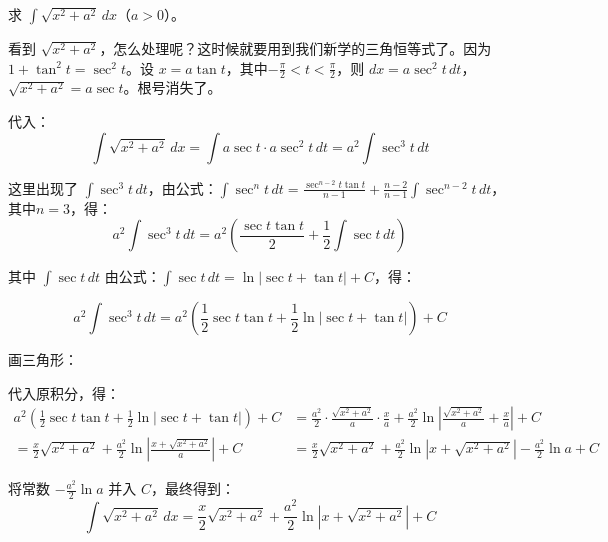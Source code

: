 \begin{myexample}
  求 $\int \sqrt{x^2 + a^2}\, dx$（$a > 0$）。

  看到 $\sqrt{x^2 + a^2}$，怎么处理呢？这时候就要用到我们新学的三角恒等式了。因为 $1 + \tan^2 t = \sec^2 t$。设 $x = a\tan t$，其中$-\frac{\pi}{2} < t < \frac{\pi}{2}$，则 $dx = a\sec^2 t\, dt$，$\sqrt{x^2 + a^2} = a\sec t$。根号消失了。

  代入：
  \[
  \int \sqrt{x^2 + a^2}\, dx = \int a\sec t \cdot a\sec^2 t\, dt = a^2 \int \sec^3 t\, dt
  \]

  这里出现了 $\int \sec^3 t\, dt$，由公式：$\int \sec^n t\,dt = \frac{\sec^{n-2}t\tan t}{n-1} + \frac{n-2}{n-1}\int \sec^{n-2}t\,dt$，其中$n=3$，得：
\[
a^2 \int \sec^3 t\,dt =a^2(\frac{\sec t\tan t}{2} + \frac{1}{2}\int \sec t\,dt)
\]

其中 $\int \sec t\,dt$ 由公式：\(\int \sec t\,dt = \ln|\sec t + \tan t| + C\)，得：

\[
a^2 \int \sec^3 t\,dt = a^2 (\frac{1}{2}\sec t \tan t + \frac{1}{2}\ln|\sec t + \tan t|) + C
\]

画三角形：
\begin{center}
\end{center}

代入原积分，得：
\[
\begin{aligned}
a^2 ( \frac{1}{2}\sec t \tan t + \frac{1}{2}\ln|\sec t + \tan t| ) + C
&= \frac{a^2}{2} \cdot \frac{\sqrt{x^2+a^2}}{a} \cdot \frac{x}{a} + \frac{a^2}{2} \ln| \frac{\sqrt{x^2+a^2}}{a} + \frac{x}{a} | + C \\[4pt]
= \frac{x}{2}\sqrt{x^2+a^2} + \frac{a^2}{2} \ln| \frac{x+\sqrt{x^2+a^2}}{a} | + C 
&= \frac{x}{2}\sqrt{x^2+a^2} + \frac{a^2}{2} \ln| x+\sqrt{x^2+a^2} | - \frac{a^2}{2}\ln a + C
\end{aligned}
\]

将常数 $-\frac{a^2}{2}\ln a$ 并入 $C$，最终得到：
\[
\int \sqrt{x^2+a^2}\,dx = \frac{x}{2}\sqrt{x^2+a^2} + \frac{a^2}{2} \ln| x+\sqrt{x^2+a^2} | + C
\]

\end{myexample}

